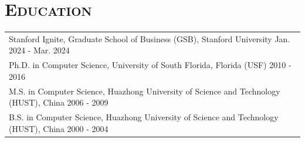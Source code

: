 \documentclass[letterpaper,11pt]{article} %
\begin{document}
\vspace*{-5pt}

\section{\Large\bf\textsc{Education}}

\begin{tabular}{p{18.5cm}}
{Stanford Ignite, Graduate School of Business (GSB), Stanford University} \hfill Jan. 2024 - Mar. 2024\\
{ Ph.D. in Computer Science, University of South Florida, Florida (USF)}  \hfill 2010 - 2016\\


%
{ M.S. in Computer Science, Huazhong University of Science and Technology (HUST), China} \hfill 2006 - 2009\\
{ B.S. in Computer Science, Huazhong University of Science and Technology (HUST), China} \hfill 2000 - 2004\\

\end{tabular}




\end{document}

